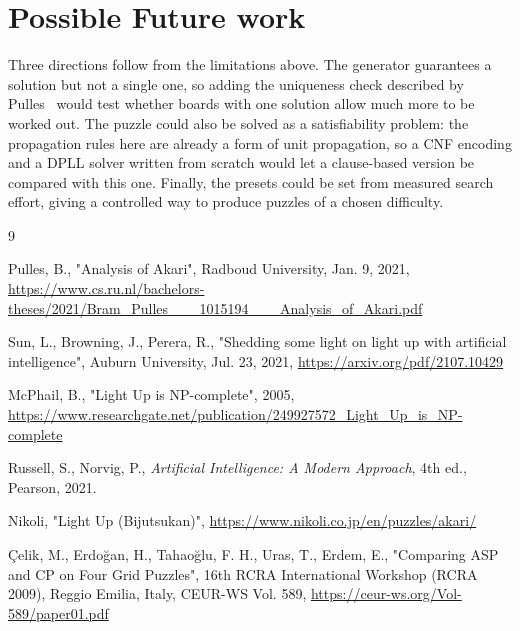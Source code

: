 \documentclass[12pt]{report}
\begin{document}
\section{Possible Future work}

Three directions follow from the limitations above. The generator guarantees a solution but
not a single one, so adding the uniqueness check described by Pulles~\cite{analysis_akari}
would test whether boards with one solution allow much more to be worked out. The puzzle
could also be solved as a satisfiability problem: the propagation rules here are already a
form of unit propagation, so a CNF encoding and a DPLL solver written from scratch would
let a clause-based version be compared with this one. Finally, the presets could be set
from measured search effort, giving a controlled way to produce puzzles of a chosen
difficulty.


\begin{thebibliography}{9}

Pulles, B., "Analysis of Akari", Radboud University, Jan. 9, 2021, \href{https://www.cs.ru.nl/bachelors-theses/2021/Bram_Pulles___1015194___Analysis_of_Akari.pdf}{https://www.cs.ru.nl/bachelors-theses/2021/Bram\_Pulles\_\_\_1015194\_\_\_Analysis\_of\_Akari.pdf}

Sun, L., Browning, J., Perera, R., "Shedding some light on light up with artificial
intelligence", Auburn University, Jul. 23, 2021, \href{https://arxiv.org/pdf/2107.10429}{https://arxiv.org/pdf/2107.10429}

McPhail, B., "Light Up is NP-complete", 2005, \href{https://www.researchgate.net/publication/249927572_Light_Up_is_NP-complete}{https://www.researchgate.net/publication/249927572\_Light\_Up\_is\_NP-complete}

Russell, S., Norvig, P., \emph{Artificial Intelligence: A Modern Approach}, 4th ed., Pearson, 2021.

Nikoli, "Light Up (Bijutsukan)", \href{https://www.nikoli.co.jp/en/puzzles/akari/}{https://www.nikoli.co.jp/en/puzzles/akari/}

Çelik, M., Erdoğan, H., Tahaoğlu, F. H., Uras, T., Erdem, E., "Comparing ASP and CP on Four Grid Puzzles", 16th RCRA International Workshop (RCRA 2009), Reggio Emilia, Italy, CEUR-WS Vol. 589, \href{https://ceur-ws.org/Vol-589/paper01.pdf}{https://ceur-ws.org/Vol-589/paper01.pdf}


\end{thebibliography}
\end{document}
